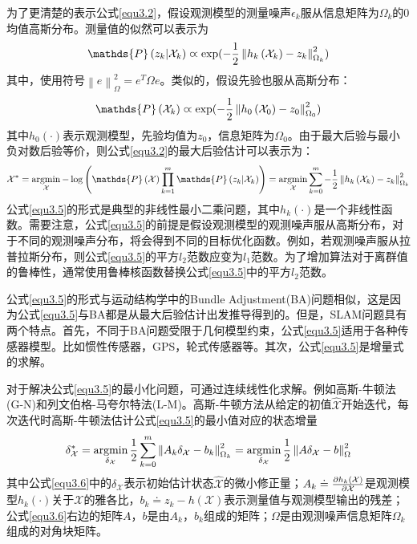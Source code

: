 为了更清楚的表示公式\eqref{equ3.2}，假设观测模型的测量噪声$\epsilon_k$服从信息矩阵为$\Omega_k$的0均值高斯分布。测量值的似然可以表示为
\begin{equation}
\label{equ3.3}
\mathds{P}\left(z_k \vert \mathcal{X}_k  \right) \varpropto \exp ( -{1 \over 2} \left\| h_k\left( \mathcal{X}_k \right) - z_k \right\|_{\Omega_k}^2 )
\end{equation}
其中，使用符号$\left\| e \right\|_{\Omega}^2 = e^T \Omega e$。类似的，假设先验也服从高斯分布：
\begin{equation}
\label{equ3.4}
\mathds{P}\left( \mathcal{X}_k  \right) \varpropto \exp ( -{1 \over 2} \left\| h_0\left( \mathcal{X}_0 \right) - z_0 \right\|_{\Omega_0}^2 )
\end{equation}
其中$h_0(\cdot)$表示观测模型，先验均值为$z_0$，信息矩阵为$\Omega_0$。由于最大后验与最小负对数后验等价，则公式\eqref{equ3.2}的最大后验估计可以表示为：
\begin{equation}
\label{equ3.5}
\mathcal{X}^* 
=
\argmin \limits_{\mathcal{X}} - \log \left( \mathds{P}\left(\mathcal{X}\right) \prod \limits_{k=1}^{m} \mathds{P}\left(z_k \vert \mathcal{X}_k  \right) \right)
=
\argmin \limits_{\mathcal{X}} \sum \limits_{k=0}^{m} -{1 \over 2} \left\| h_k\left( \mathcal{X}_k \right) - z_k \right\|_{\Omega_k}^2
\end{equation}
公式\eqref{equ3.5}的形式是典型的非线性最小二乘问题，其中$h_k(\cdot)$是一个非线性函数。需要注意，公式\eqref{equ3.5}的前提是假设观测模型的观测噪声服从高斯分布，对于不同的观测噪声分布，将会得到不同的目标优化函数。例如，若观测噪声服从拉普拉斯分布，则公式\eqref{equ3.5}的平方$l_2$范数应变为$l_1$范数。为了增加算法对于离群值的鲁棒性，通常使用鲁棒核函数\upcite{[3.4]}替换公式\eqref{equ3.5}中的平方$l_2$范数。

公式\eqref{equ3.5}的形式与运动结构学中的Bundle Adjustment(BA)问题相似，这是因为公式\eqref{equ3.5}与BA都是从最大后验估计出发推导得到的。但是，SLAM问题具有两个特点。首先，不同于BA问题受限于几何模型约束，公式\eqref{equ3.5}适用于各种传感器模型。比如惯性传感器，GPS，轮式传感器等。其次，公式\eqref{equ3.5}是增量式的求解。

对于解决公式\eqref{equ3.5}的最小化问题，可通过连续线性化求解。例如高斯-牛顿法(G-N)和列文伯格-马夸尔特法(L-M)。高斯-牛顿方法从给定的初值$\hat{\mathcal{X}}$开始迭代，每次迭代时高斯-牛顿法估计公式\eqref{equ3.5}的最小值对应的状态增量
\begin{equation}
\label{equ3.6}
\delta_\mathcal{X}^* 
=
\operatorname*{argmin} \limits_{\delta_\mathcal{X}} {1 \over 2} \sum \limits_{k=0}^{m} \left\| A_k\delta_\mathcal{X}-b_k \right\|_{\Omega_k}^2
=
\operatorname*{argmin} \limits_{\delta_\mathcal{X}} {1 \over 2} \left\| A\delta_\mathcal{X}-b \right\|_{\Omega}^2
\end{equation}
其中公式\eqref{equ3.6}中的$\delta_\mathcal{X}$表示初始估计状态$\hat{\mathcal{X}}$的微小修正量；$A_k \doteq {\partial h_k(\mathcal{X}) \over \partial \mathcal{X}} $是观测模型$h_k(\cdot)$关于$\mathcal{X}$的雅各比，$b_k \doteq z_k-h(\mathcal{X})$表示测量值与观测模型输出的残差；公式\eqref{equ3.6}右边的矩阵$A$，$b$是由$A_k$，$b_k$组成的矩阵；$\Omega$是由观测噪声信息矩阵$\Omega_k$组成的对角块矩阵。

